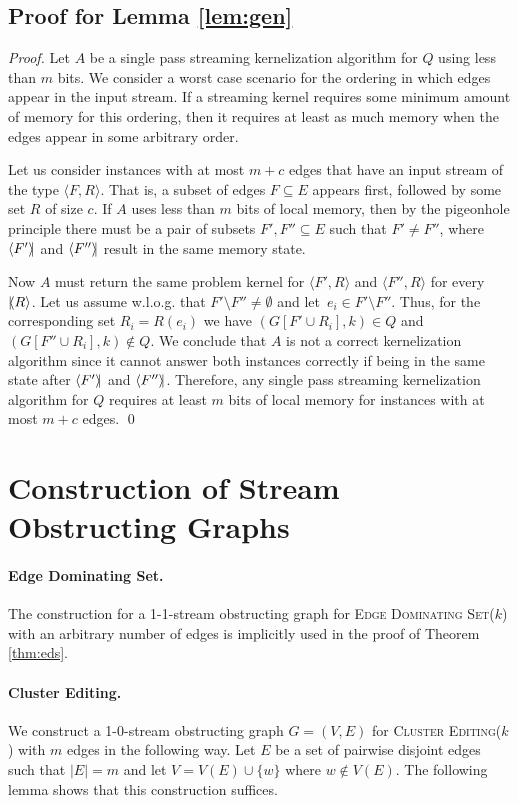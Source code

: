 \documentclass[draft,a4paper]{llncs}
\newcommand{\halt}{\mathbin{\rangle\mkern-4mu|}}
\newcommand{\resume}{\mathbin{|\mkern-4mu\langle}}
\newcommand{\EDSk}{\textsc{Edge Dominating Set($k$)}\xspace}
\newcommand{\CEk}{\textsc{Cluster Editing($k$)}\xspace}
\begin{document}
\subsection{Proof for Lemma \ref{lem:gen}}
\begin{proof}
 Let $A$ be a single pass streaming kernelization algorithm for $Q$ using less than $m$ bits. We consider a worst case scenario for the ordering in which edges appear in the input stream. If a streaming kernel requires some minimum amount of memory for this ordering, then it requires at least as much memory when the edges appear in some arbitrary order. 
 
 Let us consider instances with at most $m+c$ edges that have an input stream of the type $\langle F, R \rangle$. 
 That is, a subset of edges $F \subseteq E$ appears first, followed by some set $R$ of size $c$. If $A$ uses less than $m$ bits of local memory, then by the pigeonhole principle there must be a pair of subsets $F', F'' \subseteq E$ such that $F' \neq F''$, where $\langle F' \halt$ and $\langle F'' \halt$ result in the same memory state.
 
 Now $A$ must return the same problem kernel for $\langle F', R \rangle$ and $\langle F'', R \rangle$ for every $\resume R \rangle$. Let us assume w.l.o.g. that $F' \setminus F'' \neq \emptyset$ and let~$e_i \in F' \setminus F''$. Thus, for the corresponding set $R_i=R(e_i)$ we have $(G[F' \cup R_i], k) \in Q$ and $(G[F'' \cup R_i],k) \notin Q$. We conclude that $A$ is not a correct kernelization algorithm since it cannot answer both instances correctly if being in the same state after $\langle F' \halt$ and $\langle F'' \halt$. Therefore, any single pass streaming kernelization algorithm for $Q$ requires at least $m$ bits of local memory for instances with at most $m+c$ edges.
\qed \end{proof}

\section{Construction of Stream Obstructing Graphs} \label{app:list}
\paragraph{Edge Dominating Set.} The construction for a 1-1-stream obstructing graph for \EDSk with an arbitrary number of edges is implicitly used in the proof of Theorem \ref{thm:eds}.

\paragraph{Cluster Editing.} We construct a 1-0-stream obstructing graph $G = (V, E)$ for \CEk with $m$ edges in the following way.
Let $E$ be a set of pairwise disjoint edges such that $|E| = m$ and let $V = V(E) \cup \{w\}$ where $w \notin V(E)$. The following lemma shows that this construction suffices.
\end{document}
